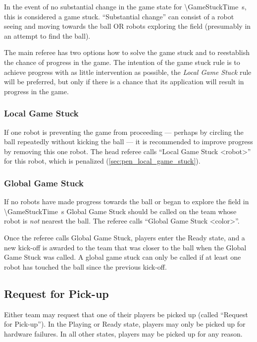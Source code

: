 In the event of no substantial change in the game state for \qty{\GameStuckTime}{\second}, this is considered a game stuck.  ``Substantial change'' can consist of a robot seeing and moving towards the ball OR robots exploring the field (presumably in an attempt to find the ball).

The main referee has two options how to solve the game stuck and to reestablish the chance of progress in the game. The intention of the game stuck rule is to achieve progress with as little intervention as possible, \ie the \emph{Local Game Stuck} rule will be preferred, but only if there is a chance that its application will result in progress in the game.

\subsubsection{Local Game Stuck}
\label{sec:game_stuck:local}

If one robot is preventing the game from proceeding --- perhaps by circling the ball repeatedly without kicking the ball --- it is recommended to improve progress by removing this one robot.
The head referee calls ``Local Game Stuck \textless robot\textgreater'' for this robot, which is penalized (\cf \cref{sec:pen_local_game_stuck}).

\subsubsection{Global Game Stuck}
\label{sec:game_stuck:global}

If no robots have made progress towards the ball or began to explore the field in \qty{\GameStuckTime}{\second} Global Game Stuck should be called on the team whose robot is \textit{not} nearest the ball.
The referee calls ``Global Game Stuck \textless color\textgreater''.

Once the referee calls Global Game Stuck, players enter the Ready state, and a new kick-off is awarded to the team that was closer to the ball when the Global Game Stuck was called. A global game stuck can only be called if at least one robot has touched the ball since the previous kick-off.

\subsection{Request for Pick-up}
\label{sec:request_for_pickup}

Either team may request that one of their players be picked up (called ``Request for Pick-up'').
In the Playing or Ready state, players may only be picked up for hardware failures.
In all other states, players may be picked up for any reason.

